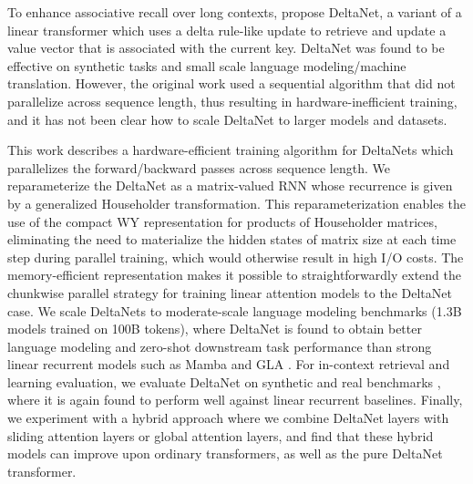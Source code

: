 To enhance  associative recall over long contexts, \citet{schlag_linear_2021} propose DeltaNet, a variant of a linear transformer which uses a  delta rule-like update   \cite{widrow_adaptive_1988} to retrieve  and update a value vector that is associated with the current key. DeltaNet was found to be effective on synthetic tasks and small scale language modeling/machine translation. However, the original work used a  sequential algorithm that did not parallelize across sequence length, thus resulting in hardware-inefficient training, and it has not been clear how to scale DeltaNet    to larger models and datasets.

This work describes a hardware-efficient training algorithm for DeltaNets which parallelizes the forward/backward passes across  sequence  length. 
We reparameterize the DeltaNet as a matrix-valued RNN whose recurrence is given by a generalized Householder transformation. This reparameterization enables the use of the compact WY representation \cite{bischof_wy_1985} for  products of Householder matrices, 
eliminating the need to materialize the hidden states of matrix size at each time step during parallel training, which would otherwise result in high I/O costs.  The memory-efficient representation makes it possible to straightforwardly extend the chunkwise parallel strategy for training linear attention models \cite{hua_transformer_2022,sun2023retentive,yang_gated_2023} to the DeltaNet case. We scale  DeltaNets to moderate-scale language modeling benchmarks (1.3B models trained on 100B tokens), where DeltaNet is found to obtain better language modeling and zero-shot downstream task performance than strong linear recurrent models such as Mamba \cite{gu_mamba_2023} and GLA \cite{yang_gated_2023}. For in-context retrieval and learning evaluation, we evaluate DeltaNet on synthetic and real benchmarks \cite{zoology,akyurek2024context,poli_mechanistic_2024, arora_simple_2024}, where it is again found to perform well against linear recurrent baselines. Finally, we experiment with a hybrid approach where we combine DeltaNet layers with sliding attention layers or global attention layers, and find that these hybrid models can improve upon ordinary transformers, as well as the pure DeltaNet transformer.

